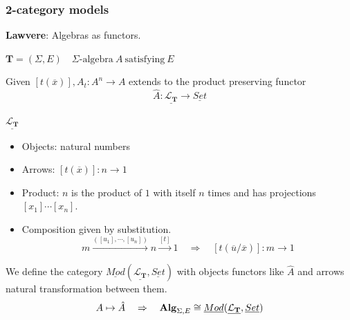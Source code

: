 \documentclass{beamer}
\begin{document}
\begin{frame}
    \frametitle{2-category models}
    \scriptsize 
    \textbf{Lawvere}: Algebras as functors.
    
    $\mathbf{T} = (\Sigma,E) \quad \Sigma\text{-algebra}\ A\ \text{satisfying}\ E$

    Given  $[t(\overline{x})], A_t:A^n \rightarrow A$ extends to the product preserving functor
    $$ \hat{A}:\underline{\mathcal{L}_\mathbf{T}} \rightarrow \underline{Set}$$

    $\underline{\mathcal{L}_\mathbf{T}}$
    \begin{itemize}
        \item Objects: natural numbers 
        \item Arrows: $[t(\overline{x})]: n \rightarrow 1$
        \item Product: $n$ is the product of $1$ with itself $n$ times and has projections $[x_1] \cdots [x_n]$.
        \item Composition given by substitution. 
         $$ m \xrightarrow{([u_1],\cdots,[u_n])} n \xrightarrow{[t]} 1 \quad \Rightarrow\quad [t(\overline{u}/\overline{x})]:m \rightarrow 1$$ 
    \end{itemize}
    We define the category $\underline{Mod}(\underline{\mathcal{L}_\mathbf{T}},\underline{Set})$ with objects functors like $\hat{A}$ and arrows 
    natural transformation between them.
    $$A \mapsto \hat{A}\quad \Rightarrow\quad\text{\textbf{Alg}}_{\Sigma,E} \cong \underline{Mod}(\underline{\mathcal{L}_\mathbf{T}},\underline{Set})$$
\end{frame}
\end{document}
